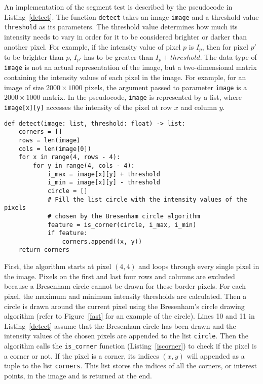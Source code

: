 An implementation of the segment test is described by the pseudocode in Listing~\ref{detect}. The function \texttt{detect} takes an image \texttt{image} and a threshold value \texttt{threshold} as its parameters. The threshold value determines how much its intensity needs to vary in order for it to be considered brighter or darker than another pixel. For example, if the intensity value of pixel $p$ is $I_p$, then for pixel $p'$ to be brighter than $p$, $I_{p'}$ has to be greater than $I_p + threshold$. The data type of \texttt{image} is not an actual representation of the image, but a two-dimensional matrix containing the intensity values of each pixel in the image. For example, for an image of size $2000 \times 1000$ pixels, the argument passed to parameter \texttt{image} is a $2000 \times 1000$ matrix. In the pseudocode, \texttt{image} is represented by a list, where \texttt{image[x][y]} accesses the intensity of the pixel at row $x$ and column $y$.

\vspace{-.2 in}
\begin{singlespace}
\begin{lstlisting}[mathescape, caption= Find corners in image, label=detect]
def detect(image: list, threshold: float) -> list:
    corners = []
    rows = len(image)
    cols = len(image[0])
    for x in range(4, rows - 4):
        for y in range(4, cols - 4):
            i_max = image[x][y] + threshold
            i_min = image[x][y] - threshold
            circle = []
            # Fill the list circle with the intensity values of the pixels
            # chosen by the Bresenham circle algorithm
            feature = is_corner(circle, i_max, i_min)
            if feature:
                corners.append((x, y))
    return corners
\end{lstlisting}
\end{singlespace}

First, the algorithm starts at pixel $(4,4)$ and loops through every single pixel in the image. Pixels on the first and last four rows and columns are excluded because a Bresenham circle cannot be drawn for these border pixels. For each pixel, the maximum and minimum intensity thresholds are calculated. Then a circle is drawn around the current pixel using the Bresenham's circle drawing algorithm (refer to Figure~\ref{fast} for an example of the circle). Lines 10 and 11 in Listing~\ref{detect} assume that the Bresenham circle has been drawn and the intensity values of the chosen pixels are appended to the list \texttt{circle}. Then the algorithm calls the \texttt{is\_corner} function (Listing~\ref{iscorner}) to check if the pixel is a corner or not. If the pixel is a corner,  its indices $(x, y)$ will appended as a tuple to the list \texttt{corners}. This list stores the indices of all the corners, or interest points, in the image and is returned at the end. 

